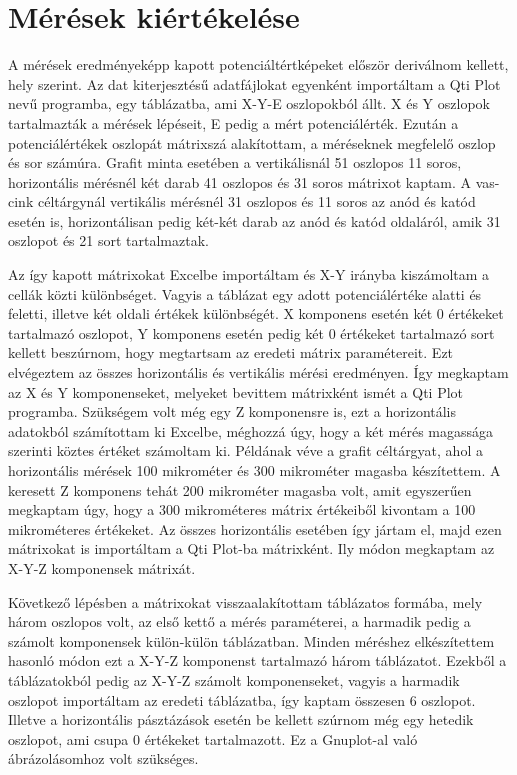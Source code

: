 \section{Mérések kiértékelése}

A mérések eredményeképp kapott potenciáltértképeket először deriválnom kellett, hely szerint. Az dat kiterjesztésű adatfájlokat egyenként importáltam a Qti Plot nevű programba, egy táblázatba, ami X-Y-E oszlopokból állt. X és Y oszlopok tartalmazták a mérések lépéseit, E pedig a mért potenciálérték. Ezután a potenciálértékek oszlopát mátrixszá alakítottam, a méréseknek megfelelő oszlop és sor számúra. Grafit minta esetében a vertikálisnál 51 oszlopos 11 soros, horizontális mérésnél két darab 41 oszlopos és 31 soros mátrixot kaptam. A vas-cink céltárgynál vertikális mérésnél 31 oszlopos és 11 soros az anód és katód esetén is, horizontálisan pedig két-két darab az anód és katód oldaláról, amik 31 oszlopot és 21 sort tartalmaztak. 

Az így kapott mátrixokat Excelbe importáltam és X-Y irányba kiszámoltam a cellák közti különbséget. Vagyis a táblázat egy adott potenciálértéke alatti és feletti, illetve két oldali értékek különbségét. X komponens esetén két 0 értékeket tartalmazó oszlopot, Y komponens esetén pedig két 0 értékeket tartalmazó sort kellett beszúrnom, hogy megtartsam az eredeti mátrix paramétereit. Ezt elvégeztem az összes horizontális és vertikális mérési eredményen. Így megkaptam az X és Y komponenseket, melyeket bevittem mátrixként ismét a Qti Plot programba. Szükségem volt még egy Z komponensre is, ezt a horizontális adatokból számítottam ki Excelbe, méghozzá úgy, hogy a két mérés magassága szerinti köztes értéket számoltam ki. Példának véve a grafit céltárgyat, ahol a horizontális mérések 100 mikrométer és 300 mikrométer magasba készítettem. A keresett Z komponens tehát 200 mikrométer magasba volt, amit egyszerűen megkaptam úgy, hogy a 300 mikrométeres mátrix értékeiből kivontam a 100 mikrométeres értékeket. Az összes horizontális esetében így jártam el, majd ezen mátrixokat is importáltam a Qti Plot-ba mátrixként. Ily módon megkaptam az X-Y-Z komponensek mátrixát.

Következő lépésben a mátrixokat visszaalakítottam táblázatos formába, mely három oszlopos volt, az első kettő a mérés paraméterei, a harmadik pedig a számolt komponensek külön-külön táblázatban. Minden méréshez elkészítettem hasonló módon ezt a X-Y-Z komponenst tartalmazó három táblázatot. Ezekből a táblázatokból pedig az X-Y-Z számolt komponenseket, vagyis a harmadik oszlopot importáltam az eredeti táblázatba, így kaptam összesen 6 oszlopot. Illetve a horizontális pásztázások esetén be kellett szúrnom még egy hetedik oszlopot, ami csupa 0 értékeket tartalmazott. Ez a Gnuplot-al való ábrázolásomhoz volt szükséges.
